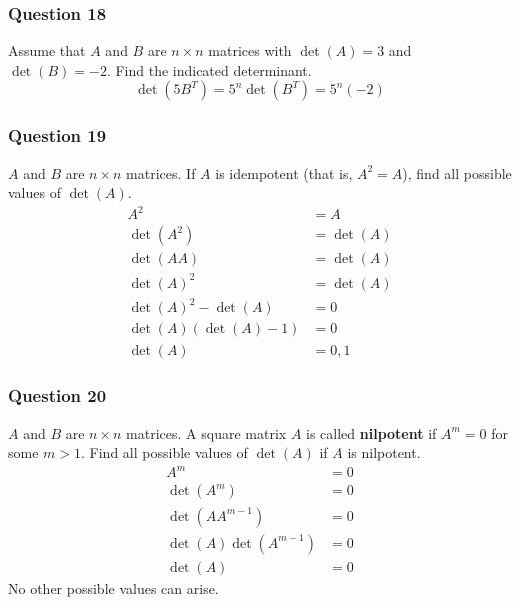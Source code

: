 \documentclass{math}
\begin{document}
\subsubsection*{Question 18}
Assume that \( A \) and \( B \) are \( n\times n \) matrices with
\( \det(A) = 3 \) and \( \det(B) = -2 \). Find the indicated determinant.
\[ \det(5B^T) = 5^n\det(B^T) = 5^n(-2) \]

\subsubsection*{Question 19}
\( A \) and \( B \) are \( n\times n \) matrices. If \( A \) is idempotent
(that is, \( A^2 = A \)), find all possible values of \( \det(A) \).
\begin{align*}
  A^2 &= A \\
  \det(A^2) &= \det(A) \\
  \det(AA) &= \det(A) \\
  \det(A)^2 &= \det(A) \\
  \det(A)^2-\det(A) &= 0 \\
  \det(A)(\det(A)-1) &= 0 \\
  \det(A) &= 0,1
\end{align*}

\subsubsection*{Question 20}
\( A \) and \( B \) are \( n\times n \) matrices. A square matrix \( A \) is
called \textbf{nilpotent} if \( A^m = 0 \) for some \( m>1 \). Find all possible
values of \( \det(A) \) if \( A \) is nilpotent.
\begin{align*}
  A^m &= 0 \\
  \det(A^m) &= 0 \\
  \det(AA^{m-1}) &= 0 \\
  \det(A)\det(A^{m-1}) &= 0 \\
  \det(A) &= 0
\end{align*}
No other possible values can arise.
\end{document}
